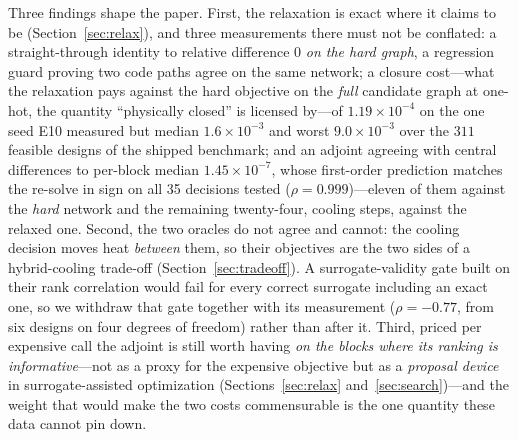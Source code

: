 \documentclass{article}
\begin{document}
Three findings shape the paper.  First, the relaxation is exact where it claims to be
(Section~\ref{sec:relax}), and three measurements there must not be conflated: a
straight-through identity to relative difference $0$ \emph{on the hard graph}, a
regression guard proving two code paths agree on the same network; a closure cost---what
the relaxation pays against the hard objective on the \emph{full} candidate graph at
one-hot, the quantity ``physically closed'' is licensed by---of $1.19\times10^{-4}$ on
the one seed E10 measured but median $1.6\times10^{-3}$ and worst $9.0\times10^{-3}$ over
the $311$ feasible designs of the shipped benchmark; and an adjoint agreeing with central
differences to per-block median $1.45\times10^{-7}$, whose first-order prediction matches
the re-solve in sign on all 35 decisions tested ($\rho = 0.999$)---eleven of them against
the \emph{hard} network and the remaining twenty-four, cooling steps, against the relaxed
one.  Second, the two
oracles do not agree and cannot: the cooling decision moves heat \emph{between} them, so
their objectives are the two sides of a hybrid-cooling trade-off
(Section~\ref{sec:tradeoff}).  A surrogate-validity gate built on their rank correlation
would fail for every correct surrogate including an exact one, so we withdraw that gate
together with its measurement ($\rho = -0.77$, from six designs on four degrees of
freedom) rather than after it.  Third, priced per expensive call the adjoint is still
worth having \emph{on the blocks where its ranking is informative}---not as a proxy for
the expensive objective but as a \emph{proposal device} in surrogate-assisted optimization
(Sections~\ref{sec:relax} and~\ref{sec:search})---and the weight that would make the two
costs commensurable is the one quantity these data cannot pin down.
\end{document}
